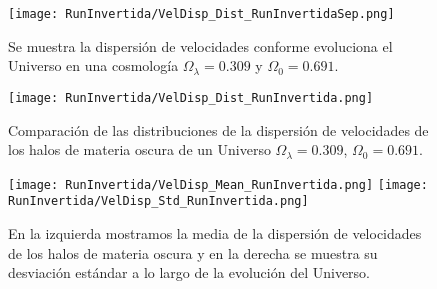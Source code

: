 \begin{figure}[H]
    \centering
    \texttt{[image: RunInvertida/VelDisp\_Dist\_RunInvertidaSep.png]}
    \caption[Dispersión de velocidades en la evolución de un Universo $\Omega_\lambda = 0.309 $, $\Omega_0 = 0.691$]{\footnotesize Se muestra la dispersión de velocidades conforme evoluciona el Universo en una cosmología $\Omega_\lambda = 0.309 $ y $\Omega_0 = 0.691$.}
    \label{fig:Invertida-VelDispDistSep}
\end{figure}

\begin{figure}[H]
    \centering
    \texttt{[image: RunInvertida/VelDisp\_Dist\_RunInvertida.png]}
    \caption[Distribución de la dispersión de velocidades de un Universo $\Omega_\lambda = 0.309 $, $\Omega_0 = 0.691$]{\footnotesize Comparación de las distribuciones de la dispersión de velocidades de los halos de materia oscura de un Universo $\Omega_\lambda = 0.309 $, $\Omega_0 = 0.691$.}
    \label{fig:Invertida-VelDispDist}
\end{figure}

\begin{figure}[H]
    \centering
    \texttt{[image: RunInvertida/VelDisp\_Mean\_RunInvertida.png]}
    \texttt{[image: RunInvertida/VelDisp\_Std\_RunInvertida.png]}
    \caption[Media y desviación estándar de la dispersión de velocidades de un Universo $\Omega_\lambda = 0.309 $, $\Omega_0 = 0.691$]{\footnotesize En la izquierda mostramos la media de la dispersión de velocidades de los halos de materia oscura y en la derecha se muestra su desviación estándar a lo largo de la evolución del Universo.}
    \label{fig:Invertida-VelDispStats}
\end{figure}

